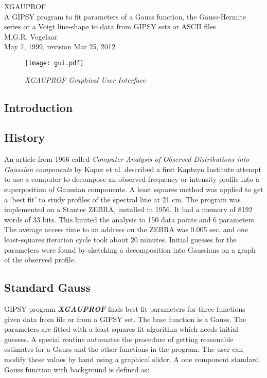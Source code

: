 \documentclass[10pt,a4paper]{report}
\begin{document}
\begin{center}
{\Large XGAUPROF}\\[1.5cm]
{\large A GIPSY program to fit parameters of a Gauss function, 
the Gauss-Hermite series or 
a Voigt line-shape to data from GIPSY sets or ASCII files }\\[1.5cm]
M.G.R. Vogelaar\\
May 7,  1999, revision Mar 25, 2012
\end{center}

\begin{figure}[htb]
  \centering
  \texttt{[image: gui.pdf]}
  \caption{\it XGAUPROF Graphical User Interface}
  \label{fig:gui}
\end{figure}  


\begin{flushleft}


\chapter{Introduction} 

\section{History}
An article from 1966 called {\it Computer Analysis of Observed Distributions
into Gaussian components} by Kaper et al. described a first Kapteyn
Institute attempt to use a computer to decompose an observed frequency 
or intensity profile  
into a superposition of Gaussian components. A least squares method was 
applied to get a `best fit' to study profiles of the spectral line at 21 cm. 
The program was implemented on a Stantec ZEBRA, installed in 1956. It had a
memory of 8192 words of 33 bits. This limited the analysis to 150 data points
and 6 parameters. The average access time to an address on the ZEBRA was 
0.005 sec. and one least-squares iteration cycle took about 20 minutes.
Initial guesses for the parameters were found by sketching a decomposition 
into Gaussians on a graph of the observed profile. 
\section{Standard Gauss}
GIPSY program {\bf \it XGAUPROF} finds best fit parameters for three functions
given data from file or from a GIPSY set. The base function is a Gauss. 
The parameters are fitted with a least-squares fit algorithm which needs 
initial guesses. A special routine automates the procedure of getting
reasonable estimates for a Gauss and the other functions in the program.
The user can modify these values by hand
using a graphical slider. 
A one component standard Gauss function with background is defined as:


\end{flushleft}
\end{document}

